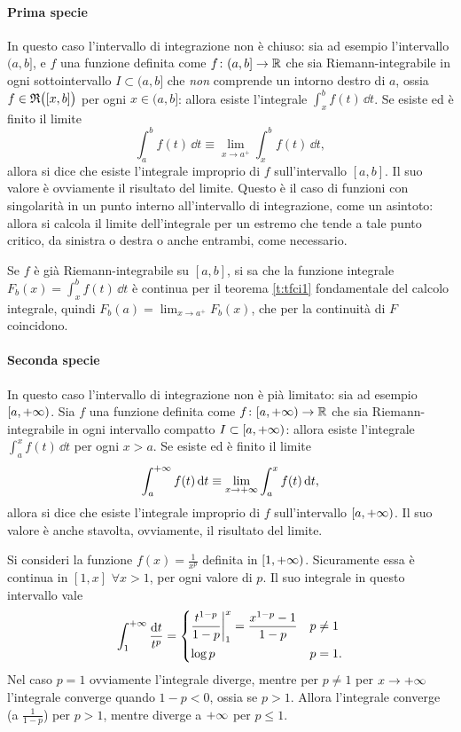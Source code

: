 \paragraph{Prima specie}
In questo caso l'intervallo di integrazione non è chiuso: sia ad esempio l'intervallo $(a,b]$, e $f$ una funzione definita come $f\colon(a,b]\to\mathbb{R}$ che sia Riemann-integrabile in ogni sottointervallo $I\subset(a,b]$ che \emph{non} comprende un intorno destro di $a$, ossia $f\in\mathfrak{R}\big([x,b]\big)$ per ogni $x\in(a,b]$: allora esiste l'integrale $\int_x^bf(t)\,\dd t$.  Se esiste ed è finito il limite
\[
\int_a^bf(t)\,\dd t\equiv\lim_{x\to a^+}\int_x^bf(t)\,\dd t,
\]
allora si dice che esiste l'integrale improprio di $f$ sull'intervallo $[a,b]$. Il suo valore è ovviamente il risultato del limite.
Questo è il caso di funzioni con singolarità in un punto interno all'intervallo di integrazione, come un asintoto: allora si calcola il limite dell'integrale per un estremo che tende a tale punto critico, da sinistra o destra o anche entrambi, come necessario.
\begin{osservazione}
Se $f$ è già Riemann-integrabile su $[a,b]$, si sa che la funzione integrale $F_b(x)=\int_x^bf(t)\,\dd t$ è continua per il teorema \ref{t:tfci1} fondamentale del calcolo integrale, quindi $F_b(a)=\lim_{x\to a^+}F_b(x)$, che per la continuità di $F$ coincidono.
\end{osservazione}
\paragraph{Seconda specie}
In questo caso l'intervallo di integrazione non è pià limitato: sia ad esempio $[a,+\infty)$. Sia $f$ una funzione definita come $f\colon[a,+\infty)\to\mathbb{R}$ che sia Riemann-integrabile in ogni intervallo compatto $I\subset[a,+\infty)$: allora esiste l'integrale $\int_a^xf(t)\,\dd t$ per ogni $x>a$. Se esiste ed è finito il limite
\[
\int_a^{+\infty} f(t)\,\textup{d} t\equiv\lim_{x\to+\infty}\int_a^xf(t)\,\textup{d} t,
\]
allora si dice che esiste l'integrale improprio di $f$ sull'intervallo $[a,+\infty)$. Il suo valore è anche stavolta, ovviamente, il risultato del limite.

Si consideri la funzione $f(x)=\frac1{x^p}$ definita in $[1,+\infty)$. Sicuramente essa è continua in $[1,x]$ $\forall x>1$, per ogni valore di $p$. Il suo integrale in questo intervallo vale
\[
\int_1^{+\infty}\frac{\textup{d} t}{t^p}=
\begin{dcases}
	\frac{t^{1-p}}{1-p}\bigg|_1^x=\frac{x^{1-p}-1}{1-p}	&p\neq 1\\
	\log p											&p=1.
\end{dcases}
\]
Nel caso $p=1$ ovviamente l'integrale diverge, mentre per $p\neq 1$ per $x\to+\infty$ l'integrale converge quando $1-p<0$, ossia se $p>1$.
Allora l'integrale converge (a $\frac1{1-p}$) per $p>1$, mentre diverge a $+\infty$ per $p\leq 1$.

